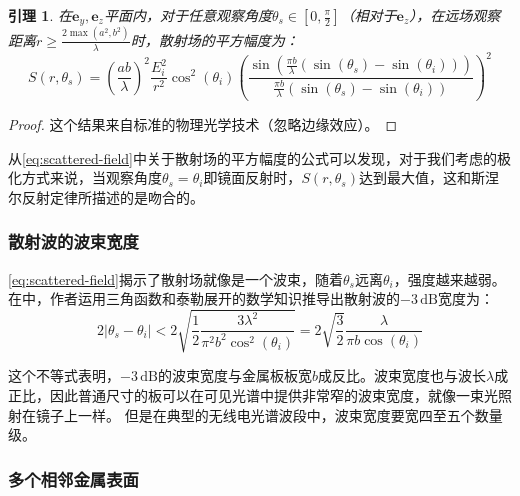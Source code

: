 \documentclass[supercite]{HustGraduPaper}
\newtheorem{lemma}{\indent 引理}[section]
\begin{document}
\begin{lemma}
	\label{lemma:scattered-field}
	在$\boldsymbol{e}_{y}, \boldsymbol{e}_{z}$平面内，对于任意观察角度$\theta_{s} \in\left[0, \frac{\pi}{2}\right]$（相对于$\boldsymbol{e}_{z}$），在远场观察距离$r \geq \frac{2 \max \left(a^{2}, b^{2}\right)}{\lambda}$时，散射场的平方幅度为：
	\begin{equation}
		S\left(r, \theta_{s}\right)=\left(\frac{a b}{\lambda}\right)^{2} \frac{E_{i}^{2}}{r^{2}} \cos ^{2}\left(\theta_{i}\right)\left(\frac{\sin \left(\frac{\pi b}{\lambda}\left(\sin \left(\theta_{s}\right)-\sin \left(\theta_{i}\right)\right)\right)}{\frac{\pi b}{\lambda}\left(\sin \left(\theta_{s}\right)-\sin \left(\theta_{i}\right)\right)}\right)^{2}
		\label{eq:scattered-field}
	\end{equation}
\end{lemma}

\begin{proof}
	这个结果来自标准的物理光学技术（忽略边缘效应）\cite{balanis2012advanced}。
\end{proof}

从\autoref{eq:scattered-field}中关于散射场的平方幅度的公式可以发现，对于我们考虑的极化方式来说，当观察角度$\theta_{s}=\theta_{i}$即镜面反射时，$S\left(r, \theta_{s}\right)$达到最大值，这和斯涅尔反射定律所描述的是吻合的。

\subsubsection{散射波的波束宽度}

\autoref{eq:scattered-field}揭示了散射场就像是一个波束，随着$\theta_{s}$远离$\theta_{i}$，强度越来越弱。在中，作者运用三角函数和泰勒展开的数学知识推导出散射波的$-3\,\mathrm{dB}$宽度为：
\begin{equation}
	2\left|\theta_{s}-\theta_{i}\right|<2\sqrt{\frac{1}{2} \frac{3 \lambda^{2}}{\pi^{2} b^{2} \cos ^{2}\left(\theta_{i}\right)}}=2\sqrt{\frac{3}{2}} \frac{\lambda}{\pi b \cos \left(\theta_{i}\right)}
\end{equation}

这个不等式表明，$-3\,\mathrm{dB}$的波束宽度与金属板板宽$b$成反比。波束宽度也与波长$\lambda$成正比，因此普通尺寸的板可以在可见光谱中提供非常窄的波束宽度，就像一束光照射在镜子上一样。
但是在典型的无线电光谱波段中，波束宽度要宽四至五个数量级。

\subsubsection{多个相邻金属表面}
\end{document}
